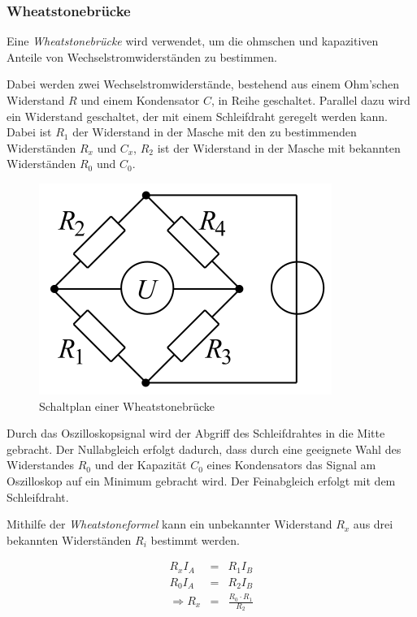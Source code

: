 \documentclass[12pt,a4paper]{scrartcl}
\numberwithin{equation}{section} %
\begin{document}
\hypertarget{wheatstonebruxfccke}{%
\subsubsection{Wheatstonebrücke}\label{wheatstonebruxfccke}}

Eine \emph{Wheatstonebrücke} wird verwendet, um die ohmschen und
kapazitiven Anteile von Wechselstromwiderständen zu bestimmen.

Dabei werden zwei Wechselstromwiderstände, bestehend aus einem Ohm'schen
Widerstand $R$ und einem Kondensator $C$, in Reihe geschaltet.
Parallel dazu wird ein Widerstand geschaltet, der mit einem Schleifdraht
geregelt werden kann. Dabei ist $R_1$ der Widerstand in der Masche mit
den zu bestimmenden Widerständen $R_x$ und $C_x$, $R_2$ ist der
Widerstand in der Masche mit bekannten Widerständen $R_0$ und $C_0$.

\begin{figure}
	\centering
	\includegraphics{../media/B1.5/WhBr_Diagonalbild.png}
	\caption{Schaltplan einer Wheatstonebrücke \cite{File:WhBr_Diagonalbild}}
\end{figure}

Durch das Oszilloskopsignal wird der Abgriff des Schleifdrahtes in die
Mitte gebracht. Der Nullabgleich erfolgt dadurch, dass durch eine
geeignete Wahl des Widerstandes $R_0$ und der Kapazität $C_0$ eines
Kondensators das Signal am Oszilloskop auf ein Minimum gebracht wird.
Der Feinabgleich erfolgt mit dem Schleifdraht.

Mithilfe der \emph{Wheatstoneformel} kann ein unbekannter Widerstand
$R_x$ aus drei bekannten Widerständen $R_i$ bestimmt werden.

\begin{eqnarray}
    R_x I_A &=& R_1 I_B \\
    R_0 I_A &=& R_2 I_B \\
    \Rightarrow R_x &=& \frac{R_0\cdot R_1}{R_2}
\end{eqnarray}
\end{document}
